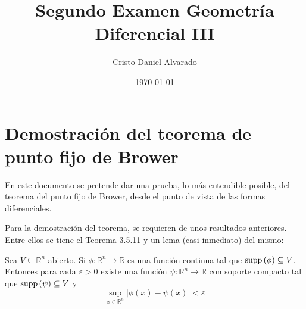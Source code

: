 \documentclass[12pt]{report}
\theoremstyle{largebreak}
\newcommand\abs[1]{\ensuremath{\lvert#1\rvert}}
\newcommand\cf[3]{\ensuremath{#1:#2\rightarrow#3}}
\newcommand\supp[1]{\ensuremath{\textup{supp}\left(#1\right)}}
\begin{document}
    \title{Segundo Examen Geometría Diferencial III}
    \author{Cristo Daniel Alvarado}
    \date{\today}
    \maketitle

    \setcounter{chapter}{3} %
    \setcounter{section}{5}
    \section{Demostración del teorema de punto fijo de Brower}
    
En este documento se pretende dar una prueba, lo más entendible posible, del teorema del punto fijo de Brower, desde el punto de vista de las formas diferenciales. 

Para la demostración del teorema, se requieren de unos resultados anteriores. Entre ellos se tiene el Teorema 3.5.11 y un lema (casi inmediato) del mismo:

\setcounter{section}{5}
\setcounter{theor}{10}

\begin{theor}
    Sea $V\subseteq\mathbb{R}^n$ abierto. Si $\cf{\phi}{\mathbb{R}^n}{\mathbb{R}}$ es una función continua tal que $\supp{\phi}\subseteq V$. Entonces para cada $\varepsilon>0$ existe una función $\cf{\psi}{\mathbb{R}^n}{\mathbb{R}}$ con soporte compacto tal que $\supp{\psi}\subseteq V$ y
    \begin{equation*}
        \sup_{x\in\mathbb{R}^n}\abs{\phi(x)-\psi(x)}<\varepsilon
    \end{equation*}
\end{theor}
\end{document}
